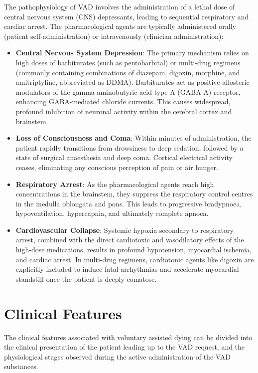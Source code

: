 The pathophysiology of VAD involves the administration of a lethal dose of central nervous system (CNS) depressants, leading to sequential respiratory and cardiac arrest. The pharmacological agents are typically administered orally (patient self-administration) or intravenously (clinician administration):
\begin{itemize}
    \item \textbf{Central Nervous System Depression}: The primary mechanism relies on high doses of barbiturates (such as pentobarbital) or multi-drug regimens (commonly containing combinations of diazepam, digoxin, morphine, and amitriptyline, abbreviated as DDMA). Barbiturates act as positive allosteric modulators of the gamma-aminobutyric acid type A (GABA-A) receptor, enhancing GABA-mediated chloride currents. This causes widespread, profound inhibition of neuronal activity within the cerebral cortex and brainstem.
    \item \textbf{Loss of Consciousness and Coma}: Within minutes of administration, the patient rapidly transitions from drowsiness to deep sedation, followed by a state of surgical anaesthesia and deep coma. Cortical electrical activity ceases, eliminating any conscious perception of pain or air hunger.
    \item \textbf{Respiratory Arrest}: As the pharmacological agents reach high concentrations in the brainstem, they suppress the respiratory control centres in the medulla oblongata and pons. This leads to progressive bradypnoea, hypoventilation, hypercapnia, and ultimately complete apnoea.
    \item \textbf{Cardiovascular Collapse}: Systemic hypoxia secondary to respiratory arrest, combined with the direct cardiotoxic and vasodilatory effects of the high-dose medications, results in profound hypotension, myocardial ischemia, and cardiac arrest. In multi-drug regimens, cardiotonic agents like digoxin are explicitly included to induce fatal arrhythmias and accelerate myocardial standstill once the patient is deeply comatose.
\end{itemize}

\section*{Clinical Features}
The clinical features associated with voluntary assisted dying can be divided into the clinical presentation of the patient leading up to the VAD request, and the physiological stages observed during the active administration of the VAD substances.

